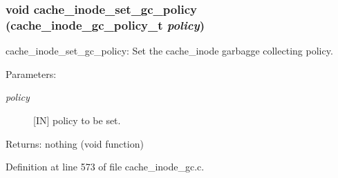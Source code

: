 \subsubsection[{cache\_\-inode\_\-set\_\-gc\_\-policy}]{\setlength{\rightskip}{0pt plus 5cm}void cache\_\-inode\_\-set\_\-gc\_\-policy (cache\_\-inode\_\-gc\_\-policy\_\-t {\em policy})}\label{group__Cache__inode__gc__interface_g69c5ffce5cdb7882aa52f72c665a2790}


cache\_\-inode\_\-set\_\-gc\_\-policy: Set the cache\_\-inode garbagge collecting policy.

\begin{Desc}
\item[Parameters:]
\begin{description}
\item[{\em policy}][IN] policy to be set.\end{description}
\end{Desc}
\begin{Desc}
\item[Returns:]nothing (void function) \end{Desc}


Definition at line 573 of file cache\_\-inode\_\-gc.c.